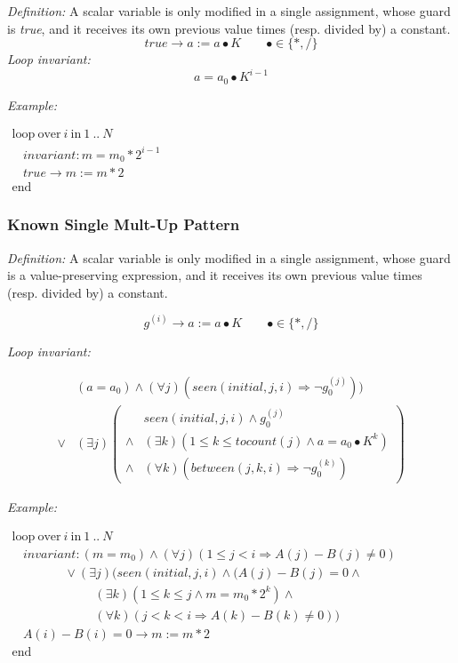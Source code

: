 \documentclass[a4paper,10pt]{article}
\newcommand{\idx}{\ensuremath{i}\xspace}
\newcommand{\idxinitial}{\ensuremath{\mathit{initial}}\xspace}
\newcommand{\at}[1]{{(#1)}}
\newcommand{\KWloop}{\ensuremath{\mathrm{loop}~}}
\newcommand{\KWend}{\ensuremath{\mathrm{end}~}}
\newcommand{\KWover}{\ensuremath{\mathrm{over}~}}
\newcommand{\KWin}{\ensuremath{~\mathrm{in}~}}
\newcommand{\impl}{\ensuremath{\Longrightarrow}}
\newcommand{\seen}[3]{\ensuremath{\mathit{seen}{(#1,#2,#3)}}\xspace}
\newcommand{\tocount}[1]{\ensuremath{\mathit{tocount}(#1)}\xspace}
\newcommand{\between}[3]{\ensuremath{\mathit{between}{(#1,#2,#3)}}\xspace}
\newcommand{\loopinvariant}{\noindent\textit{Loop invariant:}\xspace}
\newcommand{\patterndef}{\noindent\textit{Definition:}\xspace}
\newcommand{\patternexample}{\noindent\textit{Example:}\xspace}
\begin{document}
\patterndef A scalar variable is only modified in a single assignment, whose
guard is \textit{true}, and it receives its own previous value times
(resp. divided by) a constant.
%
$$\mathit{true} \rightarrow a := a \bullet K \qquad \bullet \in \{*, / \}$$
%
\loopinvariant
%
$$a = a_0 \bullet K^{i-1}$$

\bigskip
\patternexample

\medskip
$\begin{array}{l}
  \KWloop \KWover i \KWin 1~..~N \\
  ~~~~ \textit{invariant}: m = m_0 * 2^{i-1}\\
  ~~~~ true \rightarrow m := m*2\\
  \KWend
\end{array}$

\subsubsection*{Known Single Mult-Up Pattern}

\patterndef A scalar variable is only modified in a single assignment, whose
guard is a value-preserving expression, and it receives its own previous value times
(resp. divided by) a constant.

$$g^\at{\idx} \rightarrow a := a \bullet K  \qquad \bullet \in \{*, / \}$$

\loopinvariant

\begin{eqnarray*}
&(a = a_0) \land (\forall j)(\seen{\idxinitial}{j}{\idx} \impl \neg g_0^\at{j})) \\
\lor 
& (\exists j)
\left(\begin{array}{cl}
& \seen{\idxinitial}{j}{\idx} \land g_0^\at{j} \\
\land& (\exists k)(1 \leq k \leq \tocount{j} \land a = a_0 \bullet K^k)\\
\land& (\forall k)(\between{j}{k}{\idx} \impl \neg g_0^\at{k})
\end{array}\right)
\end{eqnarray*}

\bigskip
\patternexample

\medskip
$\begin{array}{l}
  \KWloop \KWover i \KWin 1~..~N \\
  ~~~~ \textit{invariant}: (m = m_0) \land (\forall j)(1 \leq j < i \impl A(j)-B(j)\neq0)\\
  ~~~~~~~~~~~~~~~~~~~ \lor (\exists j)(\seen{\idxinitial}{j}{\idx} \land (A(j)-B(j)= 0 \land \\
  ~~~~~~~~~~~~~~~~~~~~~~~~~~~~~~ (\exists k)(1 \leq k \leq j \land m = m_0 * 2^k) \land\\
  ~~~~~~~~~~~~~~~~~~~~~~~~~~~~~~ (\forall k)(j < k < i \impl A(k)-B(k)\neq0))\\
  ~~~~ A(i)-B(i)=0 \rightarrow m := m*2\\
  \KWend
\end{array}$
\end{document}
